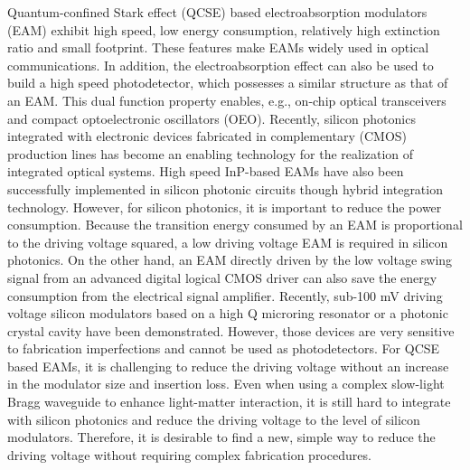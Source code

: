 \documentclass[aip,apl,reprint,a4paper]{revtex4-1}
\begin{document}

\maketitle %


Quantum-confined Stark effect (QCSE) based electroabsorption modulators (EAM) exhibit high speed, low energy consumption, relatively high extinction ratio and small footprint.\cite{Yong40,Fukano} These features make EAMs widely used in optical communications. In addition, the electroabsorption effect can also be used to build a high speed photodetector, which possesses a similar structure as that of an EAM.\cite{Welstand} This dual function property enables, e.g., on-chip optical transceivers \cite{Transceiver} and compact optoelectronic oscillators (OEO).\cite{Zhou} Recently, silicon photonics integrated with electronic devices fabricated in complementary (CMOS) production lines has become an enabling technology for the realization of integrated optical systems.\cite{Marpaung,Sun} High speed InP-based EAMs have also been successfully implemented in silicon photonic circuits though hybrid integration technology.\cite{Yong40,Transceiver,roelkensiii-v-on-silicon2015,fu52015} However, for silicon photonics, it is important to reduce the power consumption. Because the transition energy consumed by an EAM is proportional to the driving voltage squared,\cite{Yong40} a low driving voltage EAM is required in silicon photonics. On the other hand, an EAM directly driven by the low voltage swing signal from an advanced digital logical CMOS driver can also save the energy consumption from the electrical signal amplifier. Recently, sub-100 mV driving voltage silicon modulators based on a high Q microring resonator or a photonic crystal cavity have been demonstrated.\cite{Manipatruni,Shakoor:14} However, those devices are very sensitive to fabrication imperfections and cannot be used as photodetectors. For QCSE based EAMs, it is challenging to reduce the driving voltage without an increase in the modulator size and insertion loss. Even when using a complex slow-light Bragg waveguide to enhance light-matter interaction,\cite{gulow-voltage2013} it is still hard to integrate with silicon photonics and reduce the driving voltage to the level of silicon modulators. Therefore, it is desirable to find a new, simple way to reduce the driving voltage without requiring complex fabrication procedures.
\end{document}
